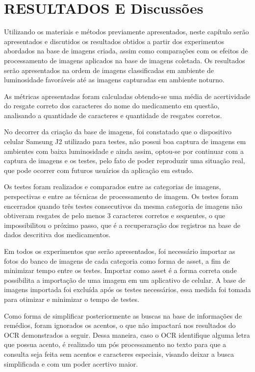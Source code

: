\chapter{RESULTADOS E Discussões}\label{ch:intro}
Utilizando os materiais e métodos previamente apresentados, neste capítulo serão
apresentados e discutidos os resultados obtidos a partir dos experimentos abordados na base de imagens criada, assim como comparações com os efeitos de processamento de imagens aplicados na base de imagens coletada. Os resultados serão apresentados na ordem de imagens classificadas em ambiente de luminosidade favoráveis até as imagens capturadas em ambiente noturno.


As métricas apresentadas foram calculadas obtendo-se uma média de acertividade do resgate correto dos caracteres do nome do medicamento em questão, analisando a quantidade de caracteres e quantidade de resgates corretos.

 No decorrer da criação da base de imagens, foi constatado que o dispositivo celular Samsung J2 utilizado para testes, não possui boa captura de imagens em ambientes com baixa luminosidade e ainda assim, optou-se por continuar com a captura de imagens e os testes, pelo fato de poder reproduzir uma situação real, que pode ocorrer com futuros usuários da aplicação em estudo.
 
Os testes foram realizados e comparados entre as categorias de imagens, perspectivas e entre as técnicas de processamento de imagem. Os testes foram encerrados quando três testes consecutivos da mesma categoria de imagens não obtiveram resgates de pelo menos 3 caracteres corretos e sequentes, o que impossibilitou o próximo passo, que é a recuperaração dos registros na base de dados descritiva dos medicamentos.

Em todos os experimentos que serão apresentados, foi necessário importar as fotos do banco de imagens de cada categoria como forma de asset, a fim de minimizar tempo entre os testes. Importar como asset é a forma correta onde possibilita a importação de uma imagem em um aplicativo de celular. A base de imagens importada foi excluída após os testes necessários, essa medida foi tomada para otimizar e minimizar o tempo de testes.

Como forma de simplificar posteriormente as buscas na base de informações de remédios, foram ignorados os acentos, o que não impactará nos resultados do OCR demonstrados a seguir. Dessa maneira, caso o OCR identifique alguma letra que possua acento, é realizado um pós processamento no texto para que a consulta seja feita sem acentos e caracteres especiais, visando deixar a busca simplificada e com um poder acertivo maior.

